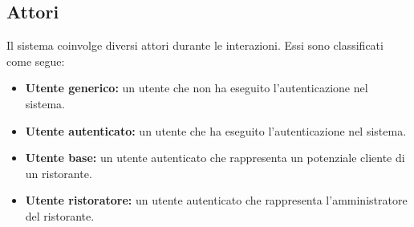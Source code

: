 \subsection{Attori}
Il sistema coinvolge diversi attori durante le interazioni. 
Essi sono classificati come segue:
\begin{itemize}
	\item \textbf{Utente generico:} un utente che non ha eseguito l'autenticazione nel sistema.
	\item \textbf{Utente autenticato:} un utente che ha eseguito l'autenticazione nel sistema.
	\item \textbf{Utente base:}  un utente autenticato che rappresenta un potenziale cliente di un ristorante.
	\item \textbf{Utente ristoratore:} un utente autenticato che rappresenta l'amministratore del ristorante.
\end{itemize}
